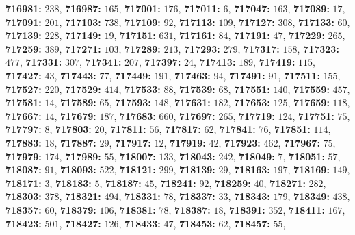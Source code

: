 \textsf{\bfseries 716981:} $238$, \textsf{\bfseries 716987:} $165$, \textsf{\bfseries 717001:} $176$, \textsf{\bfseries 717011:} $6$, \textsf{\bfseries 717047:} $163$, \textsf{\bfseries 717089:} $17$, \textsf{\bfseries 717091:} $201$, \textsf{\bfseries 717103:} $738$, \textsf{\bfseries 717109:} $92$, \textsf{\bfseries 717113:} $109$, \textsf{\bfseries 717127:} $308$, \textsf{\bfseries 717133:} $60$, \textsf{\bfseries 717139:} $228$, \textsf{\bfseries 717149:} $19$, \textsf{\bfseries 717151:} $631$, \textsf{\bfseries 717161:} $84$, \textsf{\bfseries 717191:} $47$, \textsf{\bfseries 717229:} $265$, \textsf{\bfseries 717259:} $389$, \textsf{\bfseries 717271:} $103$, \textsf{\bfseries 717289:} $213$, \textsf{\bfseries 717293:} $279$, \textsf{\bfseries 717317:} $158$, \textsf{\bfseries 717323:} $477$, \textsf{\bfseries 717331:} $307$, \textsf{\bfseries 717341:} $207$, \textsf{\bfseries 717397:} $24$, \textsf{\bfseries 717413:} $189$, \textsf{\bfseries 717419:} $115$, \textsf{\bfseries 717427:} $43$, \textsf{\bfseries 717443:} $77$, \textsf{\bfseries 717449:} $191$, \textsf{\bfseries 717463:} $94$, \textsf{\bfseries 717491:} $91$, \textsf{\bfseries 717511:} $155$, \textsf{\bfseries 717527:} $220$, \textsf{\bfseries 717529:} $414$, \textsf{\bfseries 717533:} $88$, \textsf{\bfseries 717539:} $68$, \textsf{\bfseries 717551:} $140$, \textsf{\bfseries 717559:} $457$, \textsf{\bfseries 717581:} $14$, \textsf{\bfseries 717589:} $65$, \textsf{\bfseries 717593:} $148$, \textsf{\bfseries 717631:} $182$, \textsf{\bfseries 717653:} $125$, \textsf{\bfseries 717659:} $118$, \textsf{\bfseries 717667:} $14$, \textsf{\bfseries 717679:} $187$, \textsf{\bfseries 717683:} $660$, \textsf{\bfseries 717697:} $265$, \textsf{\bfseries 717719:} $124$, \textsf{\bfseries 717751:} $75$, \textsf{\bfseries 717797:} $8$, \textsf{\bfseries 717803:} $20$, \textsf{\bfseries 717811:} $56$, \textsf{\bfseries 717817:} $62$, \textsf{\bfseries 717841:} $76$, \textsf{\bfseries 717851:} $114$, \textsf{\bfseries 717883:} $18$, \textsf{\bfseries 717887:} $29$, \textsf{\bfseries 717917:} $12$, \textsf{\bfseries 717919:} $42$, \textsf{\bfseries 717923:} $462$, \textsf{\bfseries 717967:} $75$, \textsf{\bfseries 717979:} $174$, \textsf{\bfseries 717989:} $55$, \textsf{\bfseries 718007:} $133$, \textsf{\bfseries 718043:} $242$, \textsf{\bfseries 718049:} $7$, \textsf{\bfseries 718051:} $57$, \textsf{\bfseries 718087:} $91$, \textsf{\bfseries 718093:} $522$, \textsf{\bfseries 718121:} $299$, \textsf{\bfseries 718139:} $29$, \textsf{\bfseries 718163:} $197$, \textsf{\bfseries 718169:} $149$, \textsf{\bfseries 718171:} $3$, \textsf{\bfseries 718183:} $5$, \textsf{\bfseries 718187:} $45$, \textsf{\bfseries 718241:} $92$, \textsf{\bfseries 718259:} $40$, \textsf{\bfseries 718271:} $282$, \textsf{\bfseries 718303:} $378$, \textsf{\bfseries 718321:} $494$, \textsf{\bfseries 718331:} $78$, \textsf{\bfseries 718337:} $33$, \textsf{\bfseries 718343:} $179$, \textsf{\bfseries 718349:} $438$, \textsf{\bfseries 718357:} $60$, \textsf{\bfseries 718379:} $106$, \textsf{\bfseries 718381:} $78$, \textsf{\bfseries 718387:} $18$, \textsf{\bfseries 718391:} $352$, \textsf{\bfseries 718411:} $167$, \textsf{\bfseries 718423:} $501$, \textsf{\bfseries 718427:} $126$, \textsf{\bfseries 718433:} $47$, \textsf{\bfseries 718453:} $62$, \textsf{\bfseries 718457:} $55$, 
